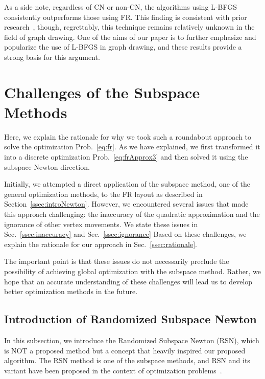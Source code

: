 \documentclass[dvipdfmx,10pt,journal,compsoc]{IEEEtran}
\begin{document}
As a side note, regardless of \textsf{CN} or non-\textsf{CN}, the algorithms using \textsf{L-BFGS} consistently outperforms those using \textsf{FR}.
This finding is consistent with prior research~\cite{6183577}, though, regrettably, this technique remains relatively unknown in the field of graph drawing.
One of the aims of our paper is to further emphasize and popularize the use of \textsf{L-BFGS} in graph drawing, and these results provide a strong basis for this argument.

\section{Challenges of the Subspace Methods}\label{sec:challenges}

Here, we explain the rationale for why we took such a roundabout approach to solve the optimization Prob.~\eqref{eq:fr}.
As we have explained, we first transformed it into a discrete optimization Prob.~\eqref{eq:frApprox3} and then solved it using the subspace Newton direction.

Initially, we attempted a direct application of the subspace method, one of the general optimization methods, to the FR layout as described in Section~\ref{ssec:introNewton}.
However, we encountered several issues that made this approach challenging: the inaccuracy of the quadratic approximation and the ignorance of other vertex movements. We state these issues in Sec.~\ref{ssec:inaccuracy} and Sec.~\ref{ssec:ignorance}
Based on these challenges, we explain the rationale for our approach in Sec.~\ref{ssec:rationale}.

The important point is that these issues do not necessarily preclude the possibility of achieving global optimization with the subspace method.
Rather, we hope that an accurate understanding of these challenges will lead us to develop better optimization methods in the future.

\subsection{Introduction of Randomized Subspace Newton}\label{ssec:introRSN}

In this subsection, we introduce the Randomized Subspace Newton (RSN), which is NOT a proposed method but a concept that heavily inspired our proposed algorithm.
The RSN method is one of the subspace methods, and RSN and its variant have been proposed in the context of optimization problems~\cite{NEURIPS2019_bc6dc48b,
    fujiRandomizedSubspaceRegularized2022,
    cartisRandomisedSubspaceMethods2022,
    nozawaRandomizedSubspaceGradient2023,
    higuchiFastConvergenceSecondOrder2024}.
\end{document}
